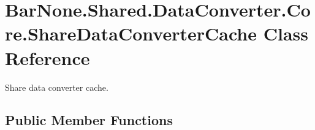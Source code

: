 \hypertarget{class_bar_none_1_1_shared_1_1_data_converter_1_1_core_1_1_share_data_converter_cache}{}\section{Bar\+None.\+Shared.\+Data\+Converter.\+Core.\+Share\+Data\+Converter\+Cache Class Reference}
\label{class_bar_none_1_1_shared_1_1_data_converter_1_1_core_1_1_share_data_converter_cache}


Share data converter cache.  


\subsection*{Public Member Functions}
